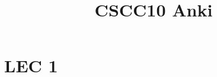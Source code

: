 \documentclass[12pt]{article}
\begin{document}
\title{CSCC10 Anki}
\maketitle

\section{LEC 1}
\end{document}
